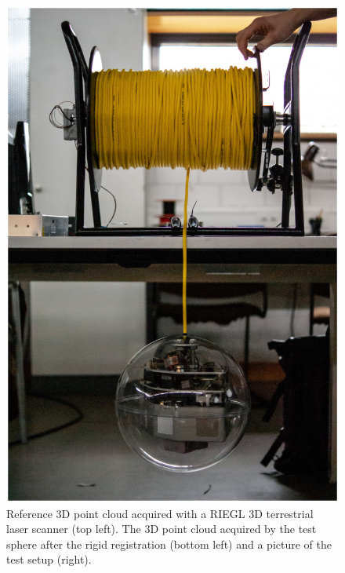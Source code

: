 \begin{figure}
\begin{minipage}[c]{0.2075\textwidth}
	  		\includegraphics[width=\textwidth]{./images/lidarsetup}
	  	\end{minipage}
		\caption{Reference 3D point cloud acquired with a RIEGL 3D terrestrial laser scanner (top left). The 3D point cloud acquired by the test sphere after the rigid registration (bottom left) and a picture of the test setup (right).}
		\label{fig:experimental-setup}
	\end{figure}
\fi


